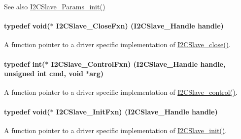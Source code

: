 \begin{DoxySeeAlso}{See also}
\hyperlink{_i2_c_slave_8h_a3c29bf7436be17348ea73fabb6ede3ae}{I2\+C\+Slave\+\_\+\+Params\+\_\+init()} 
\end{DoxySeeAlso}
\paragraph[{I2\+C\+Slave\+\_\+\+Close\+Fxn}]{\setlength{\rightskip}{0pt plus 5cm}typedef void($\ast$ I2\+C\+Slave\+\_\+\+Close\+Fxn) ({\bf I2\+C\+Slave\+\_\+\+Handle} handle)}\label{_i2_c_slave_8h_a9a2e6a8574316d6a494d208de4329fc7}


A function pointer to a driver specific implementation of \hyperlink{_i2_c_slave_8h_a323cbb394c10ab1018820c9a76eccc18}{I2\+C\+Slave\+\_\+close()}. 

\paragraph[{I2\+C\+Slave\+\_\+\+Control\+Fxn}]{\setlength{\rightskip}{0pt plus 5cm}typedef int($\ast$ I2\+C\+Slave\+\_\+\+Control\+Fxn) ({\bf I2\+C\+Slave\+\_\+\+Handle} handle, unsigned int cmd, void $\ast$arg)}\label{_i2_c_slave_8h_a895a9a94cd98b391cdd3d54ef62dd86a}


A function pointer to a driver specific implementation of \hyperlink{_i2_c_slave_8h_abcd38688f29738ee33b1748a42a3b140}{I2\+C\+Slave\+\_\+control()}. 

\paragraph[{I2\+C\+Slave\+\_\+\+Init\+Fxn}]{\setlength{\rightskip}{0pt plus 5cm}typedef void($\ast$ I2\+C\+Slave\+\_\+\+Init\+Fxn) ({\bf I2\+C\+Slave\+\_\+\+Handle} handle)}\label{_i2_c_slave_8h_ae821c2b97cf6640cd58b8e0c40efb464}


A function pointer to a driver specific implementation of \hyperlink{_i2_c_slave_8h_ad7518283a3f3fb80cefe6cb7ca7a4a36}{I2\+C\+Slave\+\_\+init()}. 

